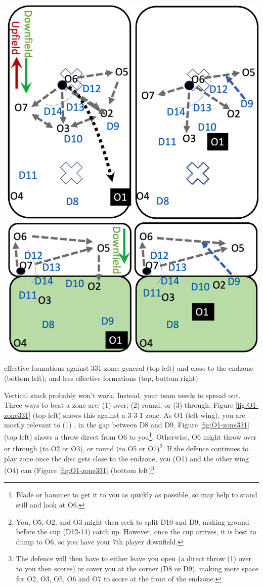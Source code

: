 \documentclass{tufte-handout}
\begin{document}
\begin{marginfigure}%
  \includegraphics[width=\linewidth]{O1-zone331}
  \caption{effective formations against 331 zone: 
  general (top left)
  and close to the endzone (bottom left); and 
  less effective formations (top, bottom right)}
  \label{fig:O1-zone331}
\end{marginfigure}

Vertical stack 
probably won't work. 
Instead, your 
team needs to 
spread out. 
Three ways to beat a zone are:
(1) over;
(2) round; or
(3) through. 
Figure \ref{fig:O1-zone331}
(top left)
shows this 
against a 
3-3-1 zone. 
As O1 
(left wing), 
you are mostly relevant to 
(1) , 
in the gap between 
D8 
and D9.
Figure \ref{fig:O1-zone331} (top left)
shows a throw 
direct 
from O6 
to you\footnote{
Blade or
hammer 
to get it 
to you
as quickly as possible, 
so may help to 
stand still 
and look at O6.}.
Otherwise, 
O6 might throw
over or through (to O2 or O3), 
or round (to O5 or O7)\footnote{
You, 
O5, 
O2, and
O3 
might then seek to split
D10
and D9,
making ground 
before the cup 
(D12-14) catch up. 
However, 
once the cup arrives, 
it is best to dump to O6, 
so you have 
your 7th player 
downfield.}. 
If the defence 
continues to play zone 
once the disc 
gets close to the endzone, 
you (O1) 
and the other wing (O4) 
can 
(Figure \ref{fig:O1-zone331} (bottom left)\footnote{ 
The defence 
will then have to either 
leave you open
(a direct throw 
(1) over to you then scores)
or cover you
at the corner
(D8 
or D9), 
making more space 
for O2, 
O3, 
O5, 
O6 and
O7 
to score 
at the front of the endzone.}.
\end{document}
